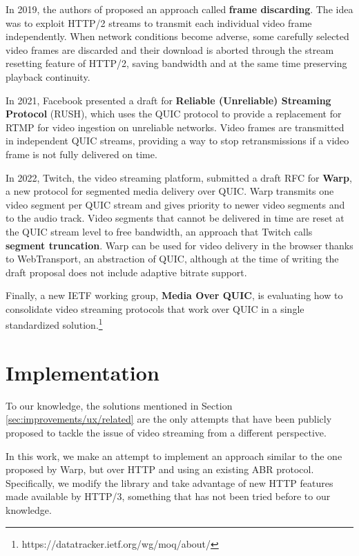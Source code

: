 In 2019, the authors of \cite{framediscarding} proposed an approach called \textbf{frame discarding}. The idea was to exploit HTTP/2 streams to transmit each individual video frame independently. When network conditions become adverse, some carefully selected video frames are discarded and their download is aborted through the stream resetting feature of HTTP/2, saving bandwidth and at the same time preserving playback continuity.

In 2021, Facebook presented a draft for \textbf{Reliable (Unreliable) Streaming Protocol} (RUSH), which uses the QUIC protocol to provide a replacement for RTMP for video ingestion on unreliable networks. Video frames are transmitted in independent QUIC streams, providing a way to stop retransmissions if a video frame is not fully delivered on time.\cite{rush}

In 2022, Twitch, the video streaming platform, submitted a draft RFC for \textbf{Warp}, a new protocol for segmented media delivery over QUIC. Warp transmits one video segment per QUIC stream and gives priority to newer video segments and to the audio track. Video segments that cannot be delivered in time are reset at the QUIC stream level to free bandwidth, an approach that Twitch calls \textbf{segment truncation}. Warp can be used for video delivery in the browser thanks to WebTransport, an abstraction of QUIC, although at the time of writing the draft proposal does not include adaptive bitrate support.\cite{warp}

Finally, a new IETF working group, \textbf{Media Over QUIC}, is evaluating how to consolidate video streaming protocols that work over QUIC in a single standardized solution.\footnote{https://datatracker.ietf.org/wg/moq/about/}

\section{Implementation}
\label{sec:improvements/impl}

To our knowledge, the solutions mentioned in Section \ref{sec:improvements/ux/related} are the only attempts that have been publicly proposed to tackle the issue of video streaming from a different perspective.

In this work, we make an attempt to implement an approach similar to the one proposed by Warp, but over HTTP and using an existing ABR protocol. Specifically, we modify the \hlsjs{} library and take advantage of new HTTP features made available by HTTP/3, something that has not been tried before to our knowledge.

